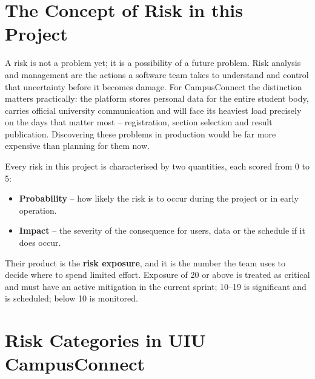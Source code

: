 \documentclass[11pt,a4paper]{report}
\begin{document}
\section{The Concept of Risk in this Project}

A risk is not a problem yet; it is a possibility of a future problem. Risk
analysis and management are the actions a software team takes to understand and
control that uncertainty before it becomes damage. For CampusConnect the
distinction matters practically: the platform stores personal data for the
entire student body, carries official university communication and will face its
heaviest load precisely on the days that matter most -- registration, section
selection and result publication. Discovering these problems in production would
be far more expensive than planning for them now.

Every risk in this project is characterised by two quantities, each scored from
0 to 5:

\begin{itemize}
  \item \textbf{Probability} -- how likely the risk is to occur during the
  project or in early operation.
  \item \textbf{Impact} -- the severity of the consequence for users, data or
  the schedule if it does occur.
\end{itemize}

Their product is the \textbf{risk exposure}, and it is the number the team uses
to decide where to spend limited effort. Exposure of 20 or above is treated as
critical and must have an active mitigation in the current sprint; 10--19 is
significant and is scheduled; below 10 is monitored.

\section{Risk Categories in UIU CampusConnect}
\end{document}
